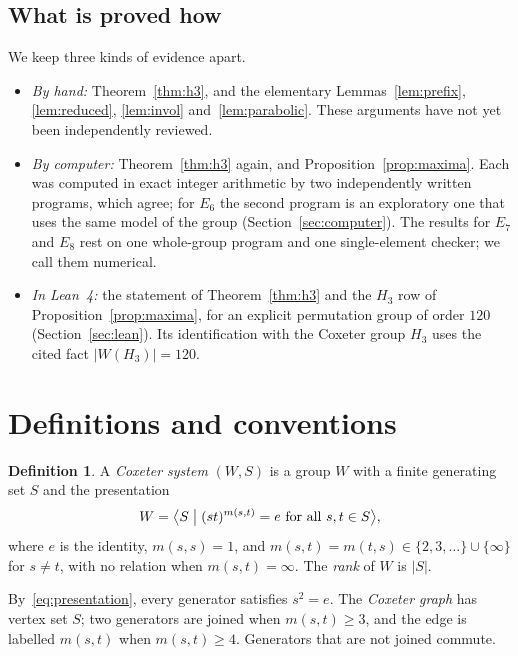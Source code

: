 \documentclass[11pt]{amsart}
\theoremstyle{definition}\newtheorem{definition}[theorem]{Definition}
\theoremstyle{remark}\newtheorem{remark}[theorem]{Remark}
\begin{document}
\subsection*{What is proved how}
We keep three kinds of evidence apart.
\begin{itemize}
\item \emph{By hand:} Theorem~\ref{thm:h3}, and the elementary Lemmas~\ref{lem:prefix}, \ref{lem:reduced}, \ref{lem:invol} and~\ref{lem:parabolic}. These arguments have not yet been independently reviewed.
\item \emph{By computer:} Theorem~\ref{thm:h3} again, and Proposition~\ref{prop:maxima}. Each was computed in exact integer arithmetic by two independently written programs, which agree; for \(E_6\) the second program is an exploratory one that uses the same model of the group (Section~\ref{sec:computer}). The results for \(E_7\) and \(E_8\) rest on one whole-group program and one single-element checker; we call them numerical.
\item \emph{In Lean~4:} the statement of Theorem~\ref{thm:h3} and the \(H_3\) row of Proposition~\ref{prop:maxima}, for an explicit permutation group of order \(120\) (Section~\ref{sec:lean}). Its identification with the Coxeter group \(H_3\) uses the cited fact \(\lvert W(H_3)\rvert=120\).
\end{itemize}

\section{Definitions and conventions}\label{sec:defs}

\begin{definition}
A \emph{Coxeter system} \((W,S)\) is a group \(W\) with a finite generating set \(S\) and the presentation
\begin{equation}\label{eq:presentation}
W=\bigl\langle S \bigm| (st)^{m(s,t)}=e \text{ for all } s,t\in S\bigr\rangle,
\end{equation}
where \(e\) is the identity, \(m(s,s)=1\), and \(m(s,t)=m(t,s)\in\{2,3,\dots\}\cup\{\infty\}\) for \(s\neq t\), with no relation when \(m(s,t)=\infty\). The \emph{rank} of \(W\) is \(\lvert S\rvert\).
\end{definition}

By~\eqref{eq:presentation}, every generator satisfies \(s^2=e\). The \emph{Coxeter graph} has vertex set \(S\); two generators are joined when \(m(s,t)\ge3\), and the edge is labelled \(m(s,t)\) when \(m(s,t)\ge4\). Generators that are not joined commute.
\end{document}
